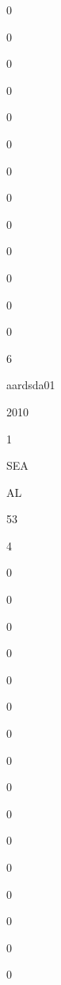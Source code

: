 \documentclass[]{article}
\begin{document}
0

0

0

0

0

0

0

0

0

0

0

0

0

6

aardsda01

2010

1

SEA

AL

53

4

0

0

0

0

0

0

0

0

0

0

0

0

0

0

0

0
\end{document}
